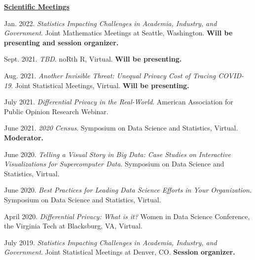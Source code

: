 \documentclass[11pt, letterpaper, roman]{moderncv} %
\begin{document}
\underline{\textbf{\large Scientific Meetings}}\normalsize
\vspace{4pt}
\begin{etaremune}[topsep=0pt, itemsep=6pt, partopsep=0pt, parsep=0pt]
    \item Jan. 2022. \textit{Statistics Impacting Challenges in Academia, Industry, and Government}. Joint Mathematics Meetings at Seattle, Washington. \textbf{Will be presenting and session organizer.}
    
    \item Sept. 2021. \textit{TBD}. noRth R, Virtual. \textbf{Will be presenting.}

    \item Aug. 2021. \textit{Another Invisible Threat: Unequal Privacy Cost of Tracing COVID-19}. Joint Statistical Meetings, Virtual. \textbf{Will be presenting.}
    
    \item July 2021. \textit{Differential Privacy in the Real-World}. American Association for Public Opinion Research Webinar.
    
    \item June 2021. \textit{2020 Census}. Symposium on Data Science and Statistics, Virtual. \textbf{Moderator.}

    \item June 2020. \textit{Telling a Visual Story in Big Data: Case Studies on Interactive Visualizations for Supercomputer Data}. Symposium on Data Science and Statistics, Virtual.
  
    \item June 2020. \textit{Best Practices for Leading Data Science Efforts in Your Organization}. Symposium on Data Science and Statistics, Virtual.  
  
  
    \item April 2020. \textit{Differential Privacy: What is it?} Women in Data Science Conference, the Virginia Tech at Blacksburg, VA, Virtual.

    \item July 2019. \textit{Statistics Impacting Challenges in Academia, Industry, and Government}. Joint Statistical Meetings at Denver, CO. \textbf{Session organizer.}


\end{etaremune}
\end{document}
